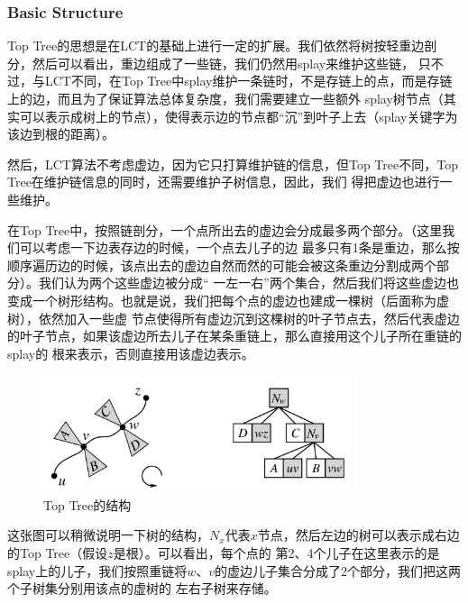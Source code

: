 ﻿\documentclass{article}
\begin{document}
		\subsubsection{Basic Structure}
		\indent Top Tree的思想是在LCT的基础上进行一定的扩展。我们依然将树按轻重边剖分，然后可以看出，重边组成了一些链，我们仍然用splay来维护这些链，
		只不过，与LCT不同，在Top Tree中splay维护一条链时，不是存链上的点，而是存链上的边，而且为了保证算法总体复杂度，我们需要建立一些额外
		splay树节点（其实可以表示成树上的节点），使得表示边的节点都“沉”到叶子上去（splay关键字为该边到根的距离）。\par
		\indent 然后，LCT算法不考虑虚边，因为它只打算维护链的信息，但Top Tree不同，Top Tree在维护链信息的同时，还需要维护子树信息，因此，我们
		得把虚边也进行一些维护。\par
		\indent 在Top Tree中，按照链剖分，一个点所出去的虚边会分成最多两个部分。（这里我们可以考虑一下边表存边的时候，一个点去儿子的边
		最多只有1条是重边，那么按顺序遍历边的时候，该点出去的虚边自然而然的可能会被这条重边分割成两个部分）。我们认为两个这些虚边被分成“
		一左一右”两个集合，然后我们将这些虚边也变成一个树形结构。也就是说，我们把每个点的虚边也建成一棵树（后面称为虚树），依然加入一些虚
		节点使得所有虚边沉到这棵树的叶子节点去，然后代表虚边的叶子节点，如果该虚边所去儿子在某条重链上，那么直接用这个儿子所在重链的splay的
		根来表示，否则直接用该虚边表示。
		\begin{figure}
			\centering
			\includegraphics[width=9.0cm]{topTree.jpg}
			\caption{Top Tree的结构}
		\end{figure}
		\indent 这张图可以稍微说明一下树的结构，$N_x$代表$x$节点，然后左边的树可以表示成右边的Top Tree（假设$z$是根）。可以看出，每个点的
		第2、4个儿子在这里表示的是splay上的儿子，我们按照重链将$w$、$v$的虚边儿子集合分成了2个部分，我们把这两个子树集分别用该点的虚树的
		左右子树来存储。\par
\end{document}
